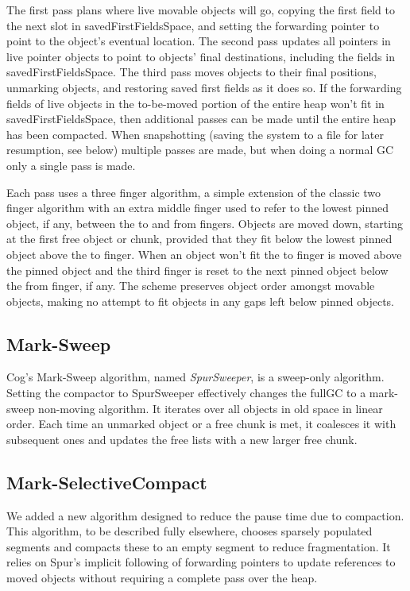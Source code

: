 \documentclass[10pt, sigplan]{acmart}
\begin{document}
The first pass plans where live movable objects will go, copying the first field to the next slot in savedFirstFieldsSpace, and setting the forwarding pointer to point to the object's eventual location. The second pass updates all pointers in live pointer objects to point to objects' final destinations, including the fields in savedFirstFieldsSpace. The third pass moves objects to their final positions, unmarking objects, and restoring saved first fields as it does so. If the forwarding fields of live objects in the to-be-moved portion of the entire heap won't fit in savedFirstFieldsSpace, then additional passes can be made until the entire heap has been compacted.  When snapshotting (saving the system to a file for later resumption, see below) multiple passes are made, but when doing a normal GC only a single pass is made.

Each pass uses a three finger algorithm, a simple extension of the classic two finger algorithm \cite{Cheney} with an extra middle finger used to refer to the lowest pinned object, if any, between the to and from fingers.  Objects are moved down, starting at the first free object or chunk, provided that they fit below the lowest pinned object above the to finger.  When an object won't fit the to finger is moved above the pinned object and the third finger is reset to the next pinned object below the from finger, if any.  The scheme preserves object order amongst movable objects, making no attempt to fit objects in any gaps left below pinned objects.

\subsection{Mark-Sweep} \label{sec:refms}

Cog's Mark-Sweep algorithm, named \emph{SpurSweeper}, is a sweep-only algorithm.  Setting the compactor to SpurSweeper effectively changes the fullGC to a mark-sweep non-moving algorithm. It iterates over all objects in old space in linear order. Each time an unmarked object or a free chunk is met, it coalesces it with subsequent ones and updates the free lists with a new larger free chunk.

\subsection{Mark-SelectiveCompact}
We added a new algorithm designed to reduce the pause time due to compaction.  This algorithm, to be described fully elsewhere, chooses sparsely populated segments and compacts these to an empty segment to reduce fragmentation.  It relies on Spur's implicit following of forwarding pointers to update references to moved objects without requiring a complete pass over the heap. 
\end{document}
